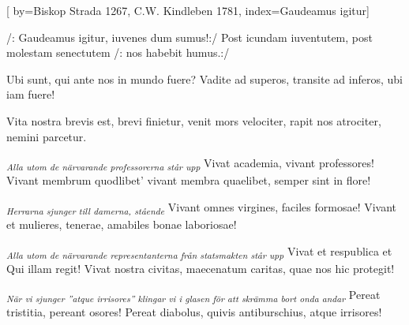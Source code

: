 [
by={Biskop Strada 1267, C.W. Kindleben 1781},
index={Gaudeamus igitur}]

\beginverse*
/: Gaudeamus igitur,
iuvenes dum sumus!:/
Post icundam iuventutem,
post molestam senectutem
/: nos habebit humus.:/
\endverse	

\beginverse*
Ubi sunt, qui ante nos
in mundo fuere?
Vadite ad superos,
transite ad inferos,
ubi iam fuere!
\endverse	

\beginverse*
Vita nostra brevis est,
brevi finietur,
venit mors velociter,
rapit nos atrociter,
nemini parcetur.
\endverse	

\beginverse*
\textsubscript{\textit{\tiny{Alla utom de närvarande professorerna står upp}}}
Vivat academia,
vivant professores!
Vivant membrum quodlibet'
vivant membra quaelibet,
semper sint in flore!
\endverse	

\beginverse*
\textsubscript{\textit{\tiny{Herrarna sjunger till damerna, stående}}}
Vivant omnes virgines,
faciles formosae!
Vivant et mulieres,
tenerae, amabiles
bonae laboriosae!
\endverse	

\beginverse*
\textsubscript{\textit{\tiny{Alla utom de närvarande representanterna från statsmakten står upp}}}
Vivat et respublica
et Qui illam regit!
Vivat nostra civitas,
maecenatum caritas,
quae nos hic protegit!
\endverse	

\beginverse*
\textsubscript{\textit{\tiny{När vi sjunger ''atque irrisores'' klingar vi i glasen för att skrämma bort onda andar}}}
Pereat tristitia,
pereant osores!
Pereat diabolus,
quivis antiburschius,
atque irrisores!
\endverse	

\vspace{1cm}

\endsong


